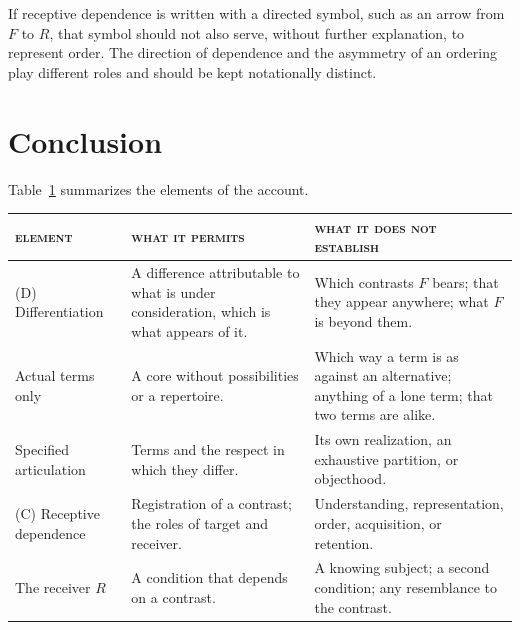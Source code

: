 \documentclass[11pt,a4paper,oneside]{scrartcl}
\newcommand{\F}{\ensuremath{F}}
\newcommand{\R}{\ensuremath{R}}
\begin{document}
If receptive dependence is written with a directed symbol, such as an arrow from \F{} to \R, that
symbol should not also serve, without further explanation, to represent order. The direction of
dependence and the asymmetry of an ordering play different roles and should be kept notationally
distinct.

\section{Conclusion}\label{sec:concl}

Table~\ref{tab:commitments} summarizes the elements of the account.

\begin{table}[htbp]
  \centering\small
  \renewcommand{\arraystretch}{1.3}
  \setlength{\tabcolsep}{5pt}
  \label{tab:commitments}
  \begin{tabularx}{\textwidth}{@{}>{\raggedright\arraybackslash}p{8.8em}
                                    >{\raggedright\arraybackslash}X
                                    >{\raggedright\arraybackslash}X@{}}
    \toprule
    \scshape element & \scshape what it permits & \scshape what it does not establish \\
    \midrule
    (D) Differentiation
      & A difference attributable to what is under consideration, which is what appears of it.
      & Which contrasts \F{} bears; that they appear anywhere; what \F{} is beyond them. \\
    Actual terms only
      & A core without possibilities or a repertoire.
      & Which way a term is as against an alternative; anything of a lone term; that two terms are
        alike. \\
    Specified articulation
      & Terms and the respect in which they differ.
      & Its own realization, an exhaustive partition, or objecthood. \\
    (C) Receptive \mbox{dependence}
      & Registration of a contrast; the roles of target and receiver.
      & Understanding, representation, order, acquisition, or retention. \\
    The receiver \R
      & A condition that depends on a contrast.
      & A knowing subject; a second condition; any resemblance to the contrast. \\
    \bottomrule
  \end{tabularx}
\end{table}
\end{document}
